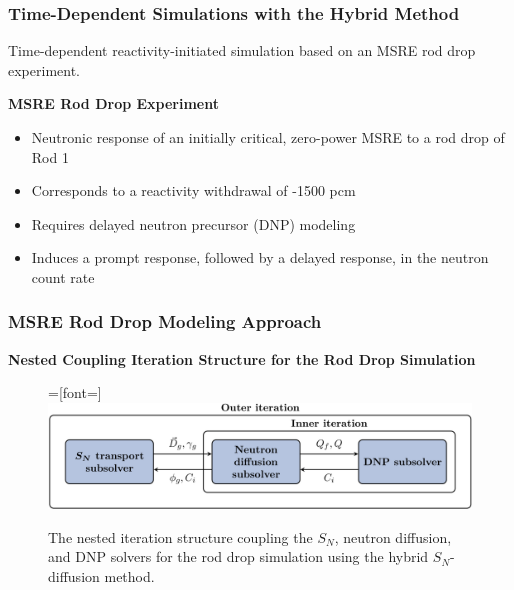 \begin{frame}
  \frametitle{Time-Dependent Simulations with the Hybrid Method}
  Time-dependent reactivity-initiated simulation based on an MSRE rod drop experiment.
  \begin{block}{\textbf{MSRE Rod Drop Experiment}}
    \begin{itemize}
      \item Neutronic response of an initially critical, zero-power MSRE to a
        rod drop of Rod 1 \cite{prince_zero-power_1968}
      \item Corresponds to a reactivity withdrawal of -1500 pcm
      \item Requires delayed neutron precursor (DNP) modeling
      \item Induces a prompt response, followed by a delayed response, in the neutron count rate
    \end{itemize}
  \end{block}
\end{frame}

\begin{frame}
  \frametitle{MSRE Rod Drop Modeling Approach}
  \textbf{Nested Coupling Iteration Structure for the Rod Drop Simulation}
  \begin{figure}[t]
    =[font=\small]
    \centering
    \includegraphics[width=\columnwidth]{images/nest-1}
    \caption{The nested iteration structure coupling the $S_N$, neutron diffusion, and \gls{DNP}
    solvers for the rod drop simulation using the hybrid $S_N$-diffusion method.}
    \label{fig:rod-drop-coupling}
  \end{figure}
\end{frame}

